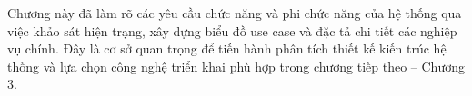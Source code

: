 \documentclass[../Project.tex]{subfiles}
\begin{document}
\vspace{0.5cm}
Chương này đã làm rõ các yêu cầu chức năng và phi chức năng của hệ thống qua việc khảo sát hiện trạng, xây dựng biểu đồ use case và đặc tả chi tiết các nghiệp vụ chính. Đây là cơ sở quan trọng để tiến hành phân tích thiết kế kiến trúc hệ thống và lựa chọn công nghệ triển khai phù hợp trong chương tiếp theo – Chương 3.
\end{document}
